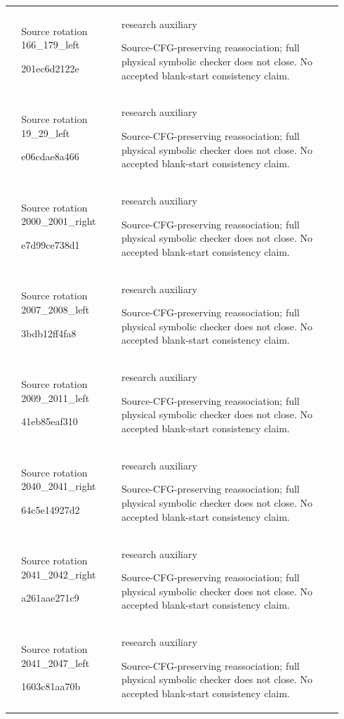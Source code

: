 {\begin{longtable}{@{}>{\raggedright\arraybackslash}p{0.035\linewidth}>{\raggedright\arraybackslash}p{0.28\linewidth}>{\raggedright\arraybackslash}p{0.625\linewidth}@{}}
54 & Source rotation 166\_179\_left\par{\ttfamily 201ec6d2122e} & research auxiliary\par Source-CFG-preserving reassociation; full physical symbolic checker does not close. No accepted blank-start consistency claim.\\[4pt]
55 & Source rotation 19\_29\_left\par{\ttfamily e06cdae8a466} & research auxiliary\par Source-CFG-preserving reassociation; full physical symbolic checker does not close. No accepted blank-start consistency claim.\\[4pt]
56 & Source rotation 2000\_2001\_right\par{\ttfamily e7d99ce738d1} & research auxiliary\par Source-CFG-preserving reassociation; full physical symbolic checker does not close. No accepted blank-start consistency claim.\\[4pt]
57 & Source rotation 2007\_2008\_left\par{\ttfamily 3bdb12ff4fa8} & research auxiliary\par Source-CFG-preserving reassociation; full physical symbolic checker does not close. No accepted blank-start consistency claim.\\[4pt]
58 & Source rotation 2009\_2011\_left\par{\ttfamily 41eb85eaf310} & research auxiliary\par Source-CFG-preserving reassociation; full physical symbolic checker does not close. No accepted blank-start consistency claim.\\[4pt]
59 & Source rotation 2040\_2041\_right\par{\ttfamily 64c5e14927d2} & research auxiliary\par Source-CFG-preserving reassociation; full physical symbolic checker does not close. No accepted blank-start consistency claim.\\[4pt]
60 & Source rotation 2041\_2042\_right\par{\ttfamily a261aae271c9} & research auxiliary\par Source-CFG-preserving reassociation; full physical symbolic checker does not close. No accepted blank-start consistency claim.\\[4pt]
61 & Source rotation 2041\_2047\_left\par{\ttfamily 1603c81aa70b} & research auxiliary\par Source-CFG-preserving reassociation; full physical symbolic checker does not close. No accepted blank-start consistency claim.\\[4pt]

\end{longtable}}
